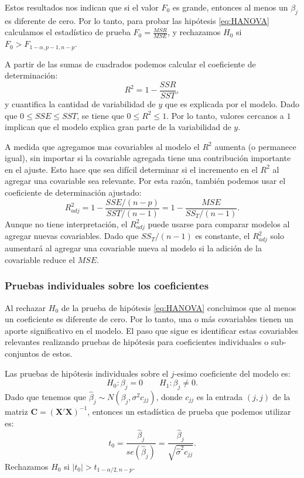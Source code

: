 \documentclass[
]{article}
\begin{document}
Estos resultados nos indican que si el valor \(F_{0}\) es grande, entonces al menos un \(\beta_{j}\) es diferente de cero. Por lo tanto, para probar las hipótesis \eqref{eq:HANOVA} calculamos el estadístico de prueba \(F_{0} = \frac{MSR}{MSE}\), y rechazamos \(H_{0}\) si \(F_{0} > F_{1-\alpha,p-1,n-p}\).

A partir de las sumas de cuadrados podemos calcular el coeficiente de determinación:
\[
R^{2} = 1-\frac{SSR}{SST},
\]
y cuantifica la cantidad de variabilidad de \(y\) que es explicada por el modelo. Dado que \(0 \leq SSE \leq SST\), se tiene que \(0 \leq R^{2} \leq 1\). Por lo tanto, valores cercanos a \(1\) implican que el modelo explica gran parte de la variabilidad de \(y\).

A medida que agregamos mas covariables al modelo el \(R^{2}\) aumenta (o permanece igual), sin importar si la covariable agregada tiene una contribución importante en el ajuste. Esto hace que sea difícil determinar si el incremento en el \(R^{2}\) al agregar una covariable sea relevante. Por esta razón, también podemos usar el coeficiente de determinación ajustado:
\[
R^{2}_{adj} = 1-\frac{SSE/(n-p)}{SST/(n-1)} = 1 - \frac{MSE}{SS_T/(n-1)}.
\]
Aunque no tiene interpretación, el \(R^{2}_{adj}\) puede usarse para comparar modelos al agregar nuevas covariables. Dado que \(SS_{T}/(n-1)\) es constante, el \(R^{2}_{adj}\) solo aumentará al agregar una covariable nueva al modelo si la adición de la covariable reduce el \(MSE\).

\subsubsection{Pruebas individuales sobre los coeficientes}\label{pruebas-individuales-sobre-los-coeficientes}

Al rechazar \(H_{0}\) de la prueba de hipótesis \eqref{eq:HANOVA} concluimos que al menos un coeficiente es diferente de cero. Por lo tanto, una o más covariables tienen un aporte significativo en el modelo. El paso que sigue es identificar estas covariables relevantes realizando pruebas de hipótesis para coeficientes individuales o sub-conjuntos de estos.

Las pruebas de hipótesis individuales sobre el \(j\)-esimo coeficiente del modelo es:
\[
  H_{0}: \beta_{j} = 0 \qquad H_{1}: \beta_{j} \neq 0.
\]
Dado que tenemos que \(\widehat{\beta}_j \sim N(\beta_j, \sigma^2 c_{jj})\), donde \(c_{jj}\) es la entrada \((j,j)\) de la matriz \(\boldsymbol C= (\boldsymbol X'\boldsymbol X)^{-1}\), entonces un estadística de prueba que podemos utilizar es:
\[
t_{0} = \frac{\widehat{\beta}_{j}}{se(\widehat{\beta}_{j})} = \frac{\widehat{\beta}_{j}}{\sqrt{\widehat{\sigma}^{2} c_{jj}}}.
\]
Rechazamos \(H_{0}\) si \(|t_{0}| > t_{1-\alpha/2,n-p}\).
\end{document}
